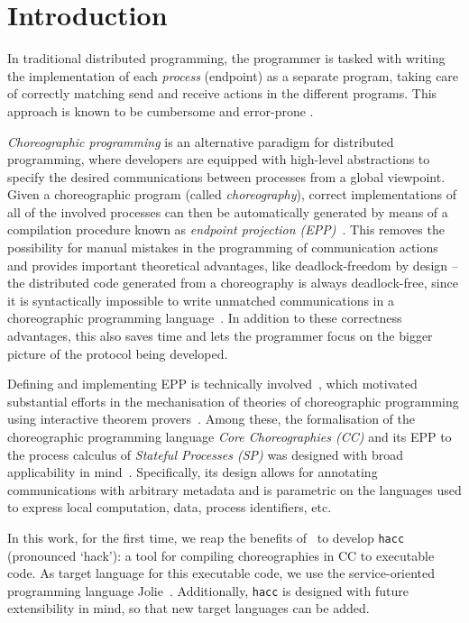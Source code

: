 \documentclass[runningheads]{llncs}
\newcommand{\toolname}{\texttt{hacc}}
\begin{document}
\section{Introduction}

In traditional distributed programming, the programmer is tasked with writing the implementation of each \emph{process} (endpoint) as a separate program, taking care of correctly matching send and receive actions in the different programs.
This approach is known to be cumbersome and error-prone \cite{LLLG16}.

\emph{Choreographic programming} \cite{M13p} is an alternative paradigm for distributed programming, where developers are equipped with high-level abstractions to specify the desired communications between processes from a global viewpoint.
Given a choreographic program (called \emph{choreography}), correct implementations of all of the involved processes can then be automatically generated by means of a compilation procedure known as \emph{endpoint projection (EPP)}~\cite{M23}.
This removes the possibility for manual mistakes in the programming of communication actions and provides important theoretical advantages, like deadlock-freedom by design -- the distributed code generated from a choreography is always deadlock-free, since it is syntactically impossible to write unmatched communications in a choreographic programming language~\cite{CM13}.
In addition to these correctness advantages, this also saves time and lets the programmer focus on the bigger picture of the protocol being developed.

Defining and implementing EPP is technically involved~\cite{SY19}, which motivated substantial efforts in the mechanisation of theories of choreographic programming using interactive theorem provers~\cite{CMP21,CMP21b,PGSN22,HG22}.
Among these, the formalisation of the choreographic programming language \emph{Core Choreographies (CC)} and its EPP to the process calculus of \emph{Stateful Processes (SP)} was designed with broad applicability in mind~\cite{CMP22}.
Specifically, its design allows for annotating communications with arbitrary metadata and is parametric on the languages used to express local computation, data, process identifiers, etc.

In this work, for the first time, we reap the benefits of~\cite{CMP22} to develop \toolname{} (pronounced `hack'): a tool for compiling choreographies in CC to executable code.
As target language for this executable code, we use the service-oriented programming language Jolie~\cite{MGZ14}.
Additionally, \toolname{} is designed with future extensibility in mind, so that new target languages can be added.
\end{document}

